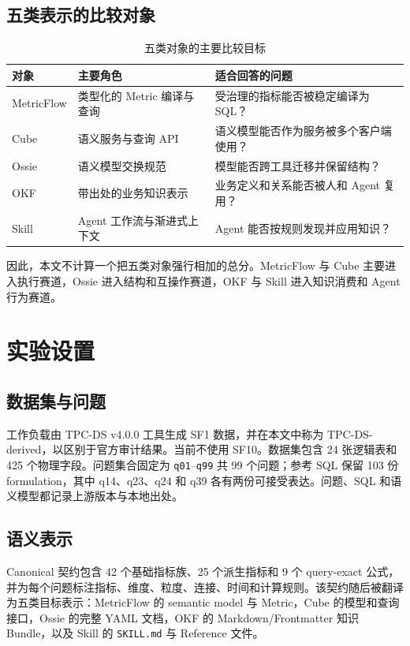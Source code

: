 \documentclass[UTF8,a4paper,12pt]{ctexart}
\newcommand{\code}[1]{\texttt{#1}}
\begin{document}
\subsection{五类表示的比较对象}

\begin{table}[ht]
\centering
\caption{五类对象的主要比较目标}
\label{tab:roles}
\small
\begin{tabularx}{\linewidth}{p{2.0cm}p{3.1cm}Y}
\toprule
\textbf{对象} & \textbf{主要角色} & \textbf{适合回答的问题}\\
\midrule
MetricFlow & 类型化的 Metric 编译与查询 & 受治理的指标能否被稳定编译为 SQL？\\
Cube & 语义服务与查询 API & 语义模型能否作为服务被多个客户端使用？\\
Ossie & 语义模型交换规范 & 模型能否跨工具迁移并保留结构？\\
OKF & 带出处的业务知识表示 & 业务定义和关系能否被人和 Agent 复用？\\
Skill & Agent 工作流与渐进式上下文 & Agent 能否按规则发现并应用知识？\\
\bottomrule
\end{tabularx}
\end{table}

因此，本文不计算一个把五类对象强行相加的总分。MetricFlow 与 Cube 主要进入执行赛道，Ossie 进入结构和互操作赛道，OKF 与 Skill 进入知识消费和 Agent 行为赛道。

\section{实验设置}

\subsection{数据集与问题}

工作负载由 TPC-DS v4.0.0 工具生成 SF1 数据，并在本文中称为 TPC-DS-derived，以区别于官方审计结果\cite{tpcds}。当前不使用 SF10。数据集包含 24 张逻辑表和 425 个物理字段。问题集合固定为 \code{q01}--\code{q99} 共 99 个问题；参考 SQL 保留 103 份 formulation，其中 q14、q23、q24 和 q39 各有两份可接受表达。问题、SQL 和语义模型都记录上游版本与本地出处。

\subsection{语义表示}

Canonical 契约包含 42 个基础指标族、25 个派生指标和 9 个 query-exact 公式，并为每个问题标注指标、维度、粒度、连接、时间和计算规则。该契约随后被翻译为五类目标表示：MetricFlow 的 semantic model 与 Metric，Cube 的模型和查询接口，Ossie 的完整 YAML 文档，OKF 的 Markdown/Frontmatter 知识 Bundle，以及 Skill 的 \code{SKILL.md} 与 Reference 文件。
\end{document}
